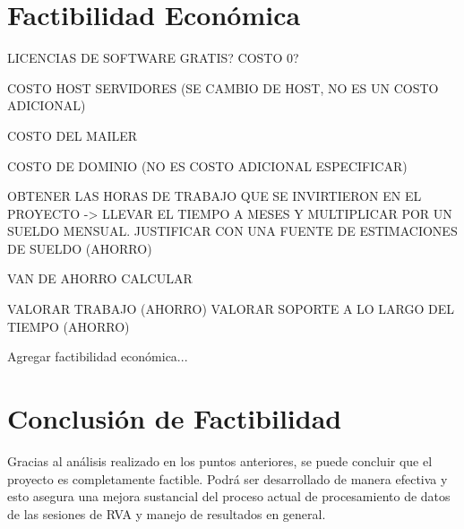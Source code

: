 \section{Factibilidad Económica}
LICENCIAS DE SOFTWARE GRATIS? COSTO 0?

COSTO HOST SERVIDORES (SE CAMBIO DE HOST, NO ES UN COSTO ADICIONAL)

COSTO DEL MAILER

COSTO DE DOMINIO (NO ES COSTO ADICIONAL ESPECIFICAR)

OBTENER LAS HORAS DE TRABAJO QUE SE INVIRTIERON EN EL PROYECTO -> LLEVAR EL TIEMPO A MESES Y MULTIPLICAR POR UN SUELDO MENSUAL. JUSTIFICAR CON UNA FUENTE DE ESTIMACIONES DE SUELDO (AHORRO)

VAN DE AHORRO CALCULAR

VALORAR TRABAJO (AHORRO)
VALORAR SOPORTE A LO LARGO DEL TIEMPO (AHORRO)

Agregar factibilidad económica...

\section{Conclusión de Factibilidad}
Gracias al análisis realizado en los puntos anteriores, se puede concluir que el proyecto es completamente factible. Podrá ser desarrollado de manera efectiva y esto asegura una mejora sustancial del proceso actual de procesamiento de datos de las sesiones de RVA y manejo de resultados en general.
